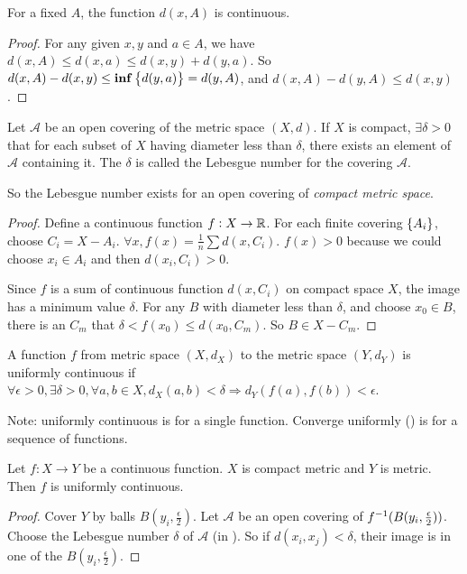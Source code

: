 \begin{theorem}
    For a fixed $A$, the function $d(x,A)$ is continuous.
\end{theorem}
\begin{proof}
    For any given $x,y$ and $a \in A$, we have $d(x,A) \leq d(x,a) \leq d(x,y) + d(y,a)$. So $d(x,A) - d(x,y) \leq \mathbf{inf} \set{d(y,a)} = d(y,A)$, and $d(x,A) - d(y,A) \leq d(x,y)$.
\end{proof}


\begin{theorem}\label{lebesgue_number}
    Let $\mathcal{A}$ be an open covering of the metric space $(X, d)$. If $X$ is compact, $\exists \delta > 0$ that for each subset of $X$ having diameter less than $\delta$, there exists an element of $\mathcal{A}$ containing it. The $\delta$ is called the Lebesgue number for the covering $\mathcal{A}$.
    
    So the Lebesgue number exists for an open covering of \emph{compact metric space}.
\end{theorem}
\begin{proof}
    Define a continuous function $f : X \rightarrow \mathbb{R}$. For each finite covering $\set{A_i}$, choose $C_i = X - A_i$. $\displaystyle \forall x, f(x) = \frac{1}{n} \sum d(x,C_i)$. $f(x) > 0$ because we could choose $x_i \in A_i$ and then $d(x_i, C_i) > 0$.
    
     Since $f$ is a sum of continuous function $d(x,C_i)$ on compact space $X$, the image has a minimum value $\delta$. For any $B$ with diameter less than $\delta$, and choose $x_0 \in B$, there is an $C_m$ that $\delta < f(x_0) \leq d(x_0, C_m)$. So $B \in X - C_m$.
\end{proof}

\begin{definition}
    A function $f$ from metric space $(X, d_X)$ to the metric space $(Y, d_Y)$ is uniformly continuous if $\forall \epsilon > 0, \exists \delta > 0, \forall a,b \in X, d_X (a,b) < \delta \Rightarrow d_Y \left(f(a), f(b)\right) < \epsilon$.
    
    Note: uniformly continuous is for a single function. Converge uniformly () is for a sequence of functions.
\end{definition}

\begin{theorem}
    Let $f: X \rightarrow Y$ be a continuous function. $X$ is compact metric and $Y$ is metric. Then $f$ is uniformly continuous.    
\end{theorem}
\begin{proof}
    Cover $Y$ by balls $B(y_i, \frac{\epsilon}{2})$. Let $\mathcal{A}$ be an open covering of ${f}^{-1}(B(y_i, \frac{\epsilon}{2}))$. Choose the Lebesgue number $\delta$ of $\mathcal{A}$ (in ). So if $d(x_i, x_j) < \delta$, their image is in one of the $B(y_i, \frac{\epsilon}{2})$.
\end{proof}





